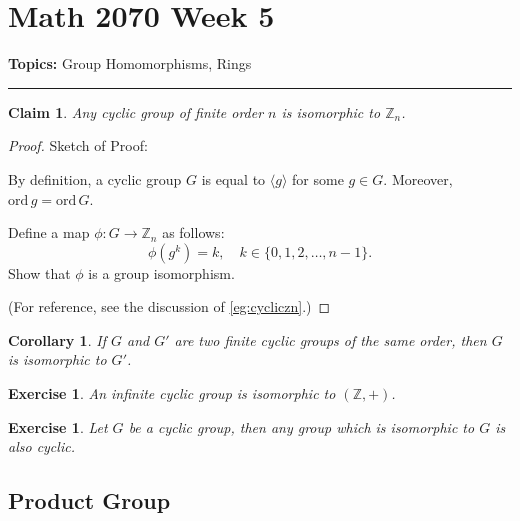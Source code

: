 \documentclass[a4paper,12pt]{report}
\newcommand{\ord}{\mathrm{ord}\,}
\renewcommand{\ord}{\mathrm{ord}\,}
\newcounter{statement}
\numberwithin{statement}{chapter}
\newtheorem{claim}[statement]{Claim}
\newtheorem{cor}[statement]{Corollary}
\newtheorem{ex}[statement]{\bf Exercise}
\numberwithin{equation}{chapter}
\numberwithin{section}{chapter}
\numberwithin{subsection}{section}
\begin{document}
\chapter*{Math 2070 Week 5}
{\bf Topics: }Group Homomorphisms, Rings
\hrule





\begin{claim}
Any cyclic group of finite order $n$ is isomorphic to $\mathbb{Z}_n$.
\end{claim}
\begin{proof}

Sketch of Proof:



By definition, a cyclic group $G$ is equal to $\langle g\rangle$ for some $g \in G$.
Moreover, $\ord g = \ord G$.



Define a map $\phi : G \longrightarrow \mathbb{Z}_n$ as follows:
\[
\phi(g^k) = k, \quad k \in \{0, 1, 2, \ldots, n - 1\}.
\]
Show that $\phi$ is a group isomorphism.



(For reference, see the discussion of \cref{eg:cycliczn}.)
\end{proof}



\begin{cor}

If $G$ and $G'$ are two finite cyclic groups of the same order, then $G$ is isomorphic to $G'$.

\end{cor}



\begin{ex}

An infinite cyclic group is isomorphic to $(\mathbb{Z}, +)$.
\end{ex}



\begin{ex}

Let $G$ be a cyclic group, then any group which is isomorphic to $G$ is also cyclic.
\end{ex}




\section{Product Group}
\end{document}
